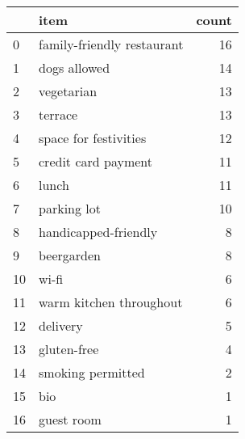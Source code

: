 \begin{tabular}{llr}
\toprule
{} &                       item &  count \\
\midrule
0  & family-friendly restaurant &     16 \\
1  &               dogs allowed &     14 \\
2  &                 vegetarian &     13 \\
3  &                    terrace &     13 \\
4  &      space for festivities &     12 \\
5  &        credit card payment &     11 \\
6  &                      lunch &     11 \\
7  &                parking lot &     10 \\
8  &       handicapped-friendly &      8 \\
9  &                 beergarden &      8 \\
10 &                      wi-fi &      6 \\
11 &    warm kitchen throughout &      6 \\
12 &                   delivery &      5 \\
13 &                gluten-free &      4 \\
14 &          smoking permitted &      2 \\
15 &                        bio &      1 \\
16 &                 guest room &      1 \\
\bottomrule
\end{tabular}
